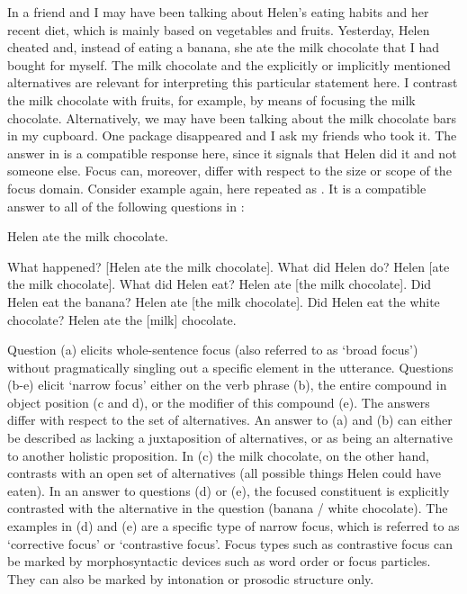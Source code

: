 In  a friend and I may have been talking about Helen’s eating habits and her recent diet, which is mainly based on vegetables and fruits. Yesterday, Helen cheated and, instead of eating a banana, she ate the milk chocolate that I had bought for myself. The milk chocolate and the explicitly or implicitly mentioned alternatives are relevant for interpreting this particular statement here. I contrast the milk chocolate with fruits, for example, by means of focusing the milk chocolate. Alternatively, we may have been talking about the milk chocolate bars in my cupboard. One package disappeared and I ask my friends who took it. The answer in  is a compatible response here, since it signals that Helen did it and not someone else. Focus can, moreover, differ with respect to the size or scope of the focus domain. Consider example  again, here repeated as . It is a compatible answer to all of the following questions in :

\begin{exe}
\ex\label{ex:5:6} Helen ate the milk chocolate.
\newpage 
\ex\label{ex:5:7} \begin{xlist}
                \ex\label{ex:5:7a} What happened?			[Helen ate the milk chocolate].
                \ex\label{ex:5:7b} What did Helen do?			Helen [ate the milk chocolate].
                \ex\label{ex:5:7c} What did Helen eat?			Helen ate [the milk chocolate].
                \ex\label{ex:5:7d} Did Helen eat the banana?		Helen ate [the milk chocolate].
                \ex\label{ex:5:7e} Did Helen eat the white chocolate?	Helen ate the [milk] chocolate.
\end{xlist}
\end{exe}

Question (a) elicits whole-sentence focus (also referred to as ‘broad focus’) without pragmatically singling out a specific element in the utterance. Questions (b-e) elicit ‘narrow focus’ either on the verb phrase (b), the entire compound in object position (c and d), or the modifier of this compound (e). The answers differ with respect to the set of alternatives. An answer to (a) and (b) can either be described as lacking a juxtaposition of alternatives, or as being an alternative to another holistic proposition. In (c) the milk chocolate, on the other hand, contrasts with an open set of alternatives (all possible things Helen could have eaten). In an answer to questions (d) or (e), the focused constituent is explicitly contrasted with the alternative in the question (banana / white chocolate). The examples in (d) and (e) are a specific type of narrow focus, which is referred to as ‘corrective focus’ or ‘contrastive focus’. Focus types such as contrastive focus can be marked by morphosyntactic devices such as word order or focus particles. They can also be marked by intonation or prosodic structure only.

